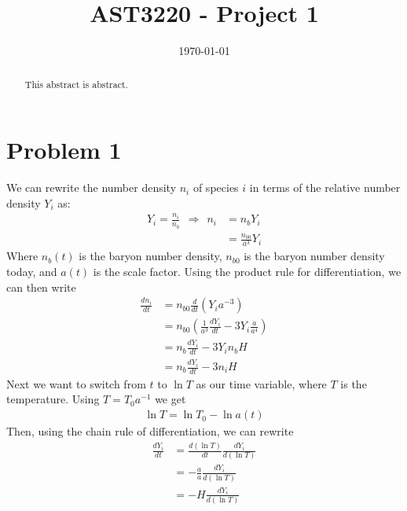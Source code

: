 \documentclass[reprint,english,notitlepage]{revtex4-1}  %
\numberwithin{equation}{section}
\begin{document}
\title{AST3220 - Project 1}   %
\date{\today}                             %
\noaffiliation                            %
\begin{abstract}                          %
This abstract is abstract.                %
\end{abstract}                            %
\maketitle                                %

\section{Problem 1}
 We can rewrite the number density $n_i$ of species $i$ in terms of the relative number
 density $Y_i$ as:
\begin{align}
	Y_i = \frac{n_i}{n_b} \ \ \Rightarrow \ \ n_i &= n_b Y_i \label{eq:rel_no_density} \\
																						&= \frac{n_{b0}}{a^3}Y_i
\end{align}
Where $n_b(t)$ is the baryon number density, $n_{b0}$ is the baryon number
density today, and $a(t)$ is the scale factor. Using the product rule for
differentiation, we can then write
\begin{align}
	\frac{d n_i}{dt} &= n_{b0}\frac{d}{dt}\left(Y_i a^{-3}\right) \\
									 &= n_{b0}\left(\frac{1}{a^3}\frac{dY_i}{dt} - 3Y_i\frac{\dot{a}}{a^4}\right) \\
									 &= n_b \frac{dY_i}{dt} - 3 Y_i n_b H \label{eq:no_density} \\
									 &= n_b \frac{dY_i}{dt} - 3 n_i H \label{eq:no_density}
\end{align}
Next we want to switch from $t$ to $\ln T$ as our time variable, where
$T$ is the temperature. Using $T=T_0 a^{-1}$ we get
\begin{align}
	\ln T = \ln T_0 - \ln a(t)
\end{align}
Then, using the chain rule of differentiation, we can rewrite
\begin{align}
	\frac{dY_i}{dt} &= \frac{d(\ln T)}{dt} \frac{dY_i}{d(\ln T)} \\
									&= -\frac{\dot{a}}{a} \frac{dY_i}{d(\ln T)} \\
									&= -H \frac{dY_i}{d(\ln T)}
\end{align}
\end{document}
